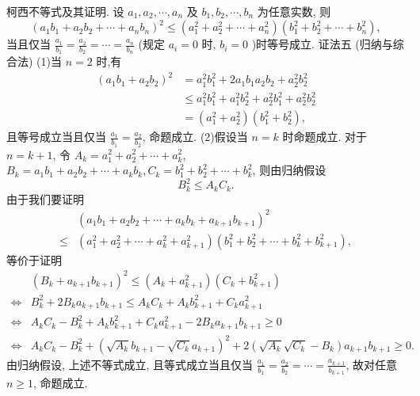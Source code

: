 柯西不等式及其证明.
设 $a_1, a_2, \cdots, a_n$ 及 $b_1, b_2, \cdots, b_n$ 为任意实数, 则
$$
\left(a_1 b_1+a_2 b_2+\cdots+a_n b_n\right)^2 \leqslant\left(a_1^2+a_2^2+\cdots+a_n^2\right)\left(b_1^2+b_2^2+\cdots+b_n^2\right),
$$
当且仅当 $\frac{a_1}{b_1}=\frac{a_2}{b_2}=\cdots=\frac{a_n}{b_n}$ (规定 $a_i=0$ 时, $b_i=0$ )时等号成立.
证法五 (归纳与综合法)
(1)当 $n=2$ 时,有
$$
\begin{aligned}
\left(a_1 b_1+a_2 b_2\right)^2 & =a_1^2 b_1^2+2 a_1 b_1 a_2 b_2+a_2^2 b_2^2 \\
& \leqslant a_1^2 b_1^2+a_1^2 b_2^2+a_2^2 b_1^2+a_2^2 b_2^2 \\
& =\left(a_1^2+a_2^2\right)\left(b_1^2+b_2^2\right),
\end{aligned}
$$
且等号成立当且仅当 $\frac{a_1}{b_1}=\frac{a_2}{b_2}$, 命题成立.
(2)假设当 $n=k$ 时命题成立.
对于 $n=k+1$, 令 $A_k=a_1^2+a_2^2+\cdots+a_k^2$, $B_k=a_1 b_1+a_2 b_2+\cdots+a_k b_k, C_k=b_1^2+b_2^2+\cdots+b_k^2$, 则由归纳假设
$$
B_k^2 \leqslant A_k C_k .
$$
由于我们要证明
$$
\begin{aligned}
& \left(a_1 b_1+a_2 b_2+\cdots+a_k b_k+a_{k+1} b_{k+1}\right)^2 \\
\leqslant & \left(a_1^2+a_2^2+\cdots+a_k^2+a_{k+1}^2\right)\left(b_1^2+b_2^2+\cdots+b_k^2+b_{k+1}^2\right),
\end{aligned}
$$
等价于证明
$$
\begin{aligned}
& \left(B_k+a_{k+1} b_{k+1}\right)^2 \leqslant\left(A_k+a_{k+1}^2\right)\left(C_k+b_{k+1}^2\right) \\
\Leftrightarrow & B_k^2+2 B_k a_{k+1} b_{k+1} \leqslant A_k C_k+A_k b_{k+1}^2+C_k a_{k+1}^2 \\
\Leftrightarrow & A_k C_k-B_k^2+A_k b_{k+1}^2+C_k a_{k+1}^2-2 B_k a_{k+1} b_{k+1} \geqslant 0 \\
\Leftrightarrow & A_k C_k-B_k^2+\left(\sqrt{A_k} b_{k+1}-\sqrt{C_k} a_{k+1}\right)^2+2\left(\sqrt{A_k} \sqrt{C_k}-B_k\right) a_{k+1} b_{k+1} \geqslant 0 .
\end{aligned}
$$
由归纳假设, 上述不等式成立, 且等式成立当且仅当 $\frac{a_1}{b_1}=\frac{a_2}{b_2}=\cdots= \frac{a_{k+1}}{b_{k+1}}$, 故对任意 $n \geqslant 1$, 命题成立.




